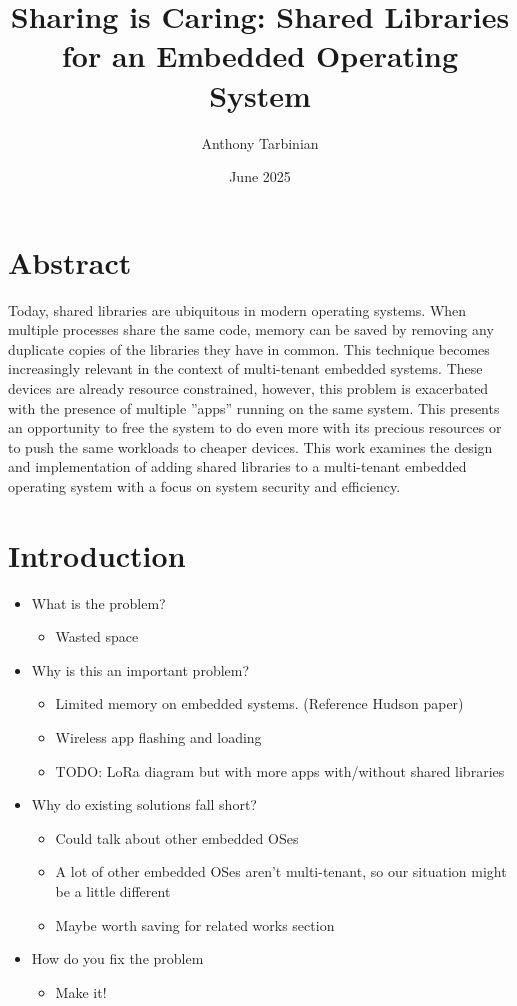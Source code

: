 \documentclass{article}
\title{Sharing is Caring: Shared Libraries for an Embedded Operating System}
\author{Anthony Tarbinian}
\date{June 2025}
\begin{document}
\maketitle

\section*{Abstract}

Today, shared libraries are ubiquitous in modern operating systems. %
When multiple processes share the same code, memory can be saved by removing any duplicate copies of the libraries they have in common. %
This technique becomes increasingly relevant in the context of multi-tenant embedded systems. %
These devices are already resource constrained, however, this problem is exacerbated with the presence of multiple ”apps” running on the same system. %
This presents an opportunity to free the system to do even more with its precious resources or to push the same workloads to cheaper devices. %
This work examines the design and implementation of adding shared libraries to a multi-tenant embedded operating system with a focus on system security and efficiency. %

\section*{Introduction}

\begin{itemize}
    \item What is the problem?
        \begin{itemize}
            \item Wasted space
        \end{itemize}
    \item Why is this an important problem?
        \begin{itemize}
            \item Limited memory on embedded systems. (Reference Hudson paper)
            \item Wireless app flashing and loading
                \item TODO: LoRa diagram but with more apps with/without shared libraries
        \end{itemize}
    \item Why do existing solutions fall short?
        \begin{itemize}
            \item Could talk about other embedded OSes
            \item A lot of other embedded OSes aren't multi-tenant, so our situation might be a little different 
            \item Maybe worth saving for related works section
        \end{itemize}
    \item How do you fix the problem
        \begin{itemize}
            \item Make it!
        \end{itemize}
\end{itemize}
\end{document}
